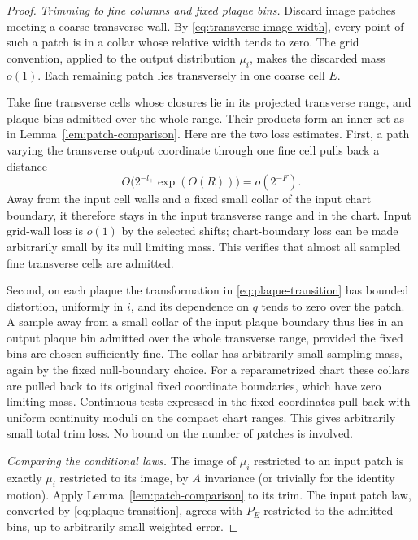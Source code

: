 \begin{proof}
\smallskip\noindent
\emph{Trimming to fine columns and fixed plaque bins.}
Discard image patches meeting a coarse transverse wall. By
\eqref{eq:transverse-image-width}, every point of such a patch is in
a collar whose relative width tends to zero. The grid convention,
applied to the output distribution $\mu_i$, makes the discarded
mass $o(1)$. Each remaining patch lies transversely in one coarse
cell $E$.

Take fine transverse cells whose closures lie in its projected
transverse range, and plaque bins admitted over the whole range.
Their products form an inner set as in
Lemma~\ref{lem:patch-comparison}. Here are the two loss estimates.
First, a path varying the transverse output coordinate through one
fine cell pulls back a distance
\begin{equation}\label{eq:fine-pullback-width}
 O\bigl(2^{-l_+}\exp(O(R))\bigr)=o(2^{-F}).
\end{equation}
Away from the input cell walls and a fixed small collar of the
input chart boundary, it therefore stays in the input transverse
range and in the chart. Input grid-wall loss is $o(1)$ by the
selected shifts; chart-boundary loss can be made arbitrarily small
by its null limiting mass. This verifies that almost all sampled
fine transverse cells are admitted.

Second, on each plaque the transformation in
\eqref{eq:plaque-transition} has bounded distortion, uniformly in
$i$, and its dependence on $q$ tends to zero over the patch. A
sample away from a small collar of the input plaque boundary thus
lies in an output plaque bin admitted over the whole transverse
range, provided the fixed bins are chosen sufficiently fine. The
collar has arbitrarily small sampling mass, again by the fixed
null-boundary choice. For a reparametrized chart these collars are
pulled back to its original fixed coordinate boundaries, which
have zero limiting mass. Continuous tests expressed in the fixed
coordinates pull back with uniform continuity moduli on the compact
chart ranges.
This gives arbitrarily small total trim loss.
No bound on the number of patches is involved.

\smallskip\noindent
\emph{Comparing the conditional laws.}
The image of $\mu_i$ restricted to an input patch is exactly
$\mu_i$ restricted to its image, by $A$ invariance (or trivially for
the identity motion). Apply Lemma~\ref{lem:patch-comparison} to its
trim. The input patch law, converted by
\eqref{eq:plaque-transition}, agrees with $P_E$ restricted to the
admitted bins, up to arbitrarily small weighted error.


\end{proof}
